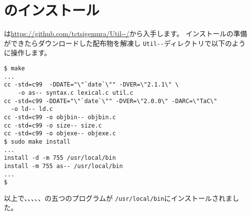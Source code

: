 % 
%
\chapter{\util のインストール}

\util は\url{https://github.com/tctsigemura/Util--/}から入手します。
インストールの準備ができたらダウンロードした配布物を解凍し
\verb/Util--/ディレクトリで以下のように操作します。

\begin{mylist}
\begin{verbatim}
$ make
...
cc -std=c99  -DDATE="\"`date`\"" -DVER=\"2.1.1\" \
	-o as-- syntax.c lexical.c util.c
cc -std=c99 -DDATE="\"`date`\"" -DVER=\"2.0.0\" -DARC=\"TaC\"
  -o ld-- ld.c
cc -std=c99 -o objbin-- objbin.c
cc -std=c99 -o size-- size.c
cc -std=c99 -o objexe-- objexe.c
$ sudo make install
...
install -d -m 755 /usr/local/bin
install -m 755 as-- /usr/local/bin
...
$
\end{verbatim}
\end{mylist}

以上で、\as 、\ld 、\objbin 、\objexe 、\size の五つのプログラムが
\verb;/usr/local/bin;にインストールされました。
